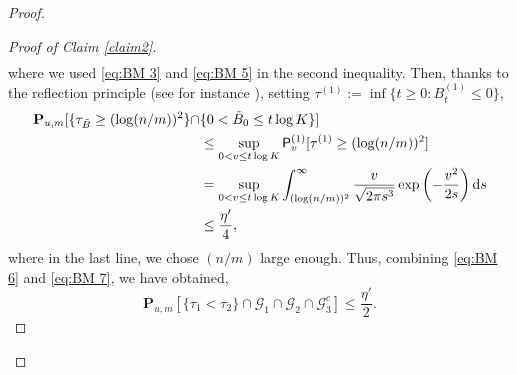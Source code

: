 \documentclass[11pt,a4paper]{article}
\numberwithin{equation}{section}
\theoremstyle{plain}
\theoremstyle{definition}
\begin{document}
\begin{proof}
\begin{proof}[Proof of Claim \textup{\ref{claim2}}]
\begin{align}
 \end{align}
 where we used \eqref{eq:BM 3} and \eqref{eq:BM 5} in the second inequality. Then, thanks to the reflection principle (see for instance \cite[Chapter~2.6]{karatzas1991brownian}), setting $\tau^{(1)}:=\inf \{t\geq 0: B_t^{(1)}\leq 0\}$,
 \begin{align}\notag
 \mathbf P_{u,m}[ \{\tau_{\tilde B} \geq (\log (n/m))^2\}\cap &\{0<\tilde B_0\leq t\log K\}]\\&\leq \sup_{0<v\leq t\log K}\mathsf P_v^{(1)}[\tau^{(1)} \geq (\log(n/m))^2]\notag\\&= \sup_{0<v\leq t\log K}
 \int_{(\log(n/m))^2}^\infty \frac{v}{\sqrt{2\pi s^3}}\exp\left(-\frac{v^2}{2s}\right)\mathrm{d}s\notag
 \\&\leq \frac{\eta'}{4} \label{eq:BM 7},
 \end{align}
 where in the last line, we chose $(n/m)$ large enough. Thus, combining \eqref{eq:BM 6} and \eqref{eq:BM 7}, we have obtained,
 \begin{equation}\label{eq:BM 7.5}
 	\mathbf P_{u,m}[\{\tau_1<\tau_2\}\cap \mathcal G_1\cap \mathcal G_2\cap 
 	\mathcal G_3^c]\leq \frac{\eta'}{2}.
 \end{equation} 

\end{proof}
\end{proof}
\end{document}
